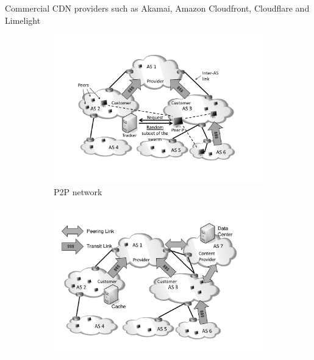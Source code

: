 Commercial CDN providers such as Akamai, Amazon Cloudfront, Cloudflare and Limelight





\begin{figure}[bt]
	\centering
\vspace{-0.2cm}
\hspace{-0.5cm}
	\begin{subfigure}[b]{0.54\textwidth}
	  \includegraphics[width=\textwidth]{aslevel/figs/p2p}
    \vspace{-0.5cm}
    \caption{P2P network}
    \label{fig:aslevel:p2p}
  \end{subfigure}
\hspace{-0.5cm}
	\begin{subfigure}[b]{0.54\textwidth}
	 	\includegraphics[width=\textwidth]{aslevel/figs/cdn}

\end{subfigure}
\end{figure}
